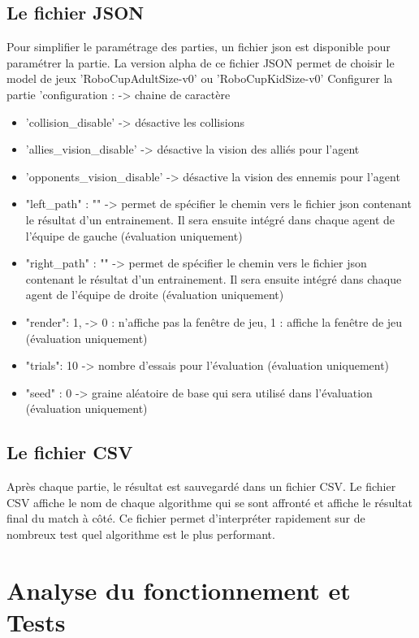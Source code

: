 \documentclass[11pt, a4paper]{article}
\begin{document}
	\subsection{Le fichier JSON}
	Pour simplifier le paramétrage des parties, un fichier json est disponible pour paramétrer la partie.
	La version alpha de ce fichier JSON permet de choisir le model de jeux 'RoboCupAdultSize-v0' ou 'RoboCupKidSize-v0'
	Configurer la partie
	'configuration : -> chaine de caractère
	\begin{itemize}
		\item 'collision\_disable' -> désactive les collisions
		\item 'allies\_vision\_disable' -> désactive la vision des alliés pour l'agent
		\item 'opponents\_vision\_disable' -> désactive la vision des ennemis pour l'agent
		\item "left\_path" : "" -> permet de spécifier le chemin vers le fichier json contenant le résultat d'un entrainement.
		Il sera ensuite intégré dans chaque agent de l'équipe de gauche (évaluation uniquement)
		\item "right\_path" : "" -> permet de spécifier le chemin vers le fichier json contenant le résultat d'un entrainement.
		Il sera ensuite intégré dans chaque agent de l'équipe de droite (évaluation uniquement)
		\item "render": 1, -> 0 : n'affiche pas la fenêtre de jeu, 1 : affiche la fenêtre de jeu (évaluation uniquement)
		\item "trials": 10 -> nombre d'essais pour l'évaluation (évaluation uniquement)
		\item "seed" : 0 -> graine aléatoire de base qui sera utilisé dans l'évaluation (évaluation uniquement)
	\end{itemize}


	\subsection{Le fichier CSV}
	Après chaque partie, le résultat est sauvegardé dans un fichier CSV. Le fichier CSV affiche le nom de chaque algorithme qui se sont affronté et affiche le résultat final du match à côté. Ce fichier permet d'interpréter rapidement sur de nombreux test quel algorithme est le plus performant.

	\section{Analyse du fonctionnement et Tests}
\end{document}
